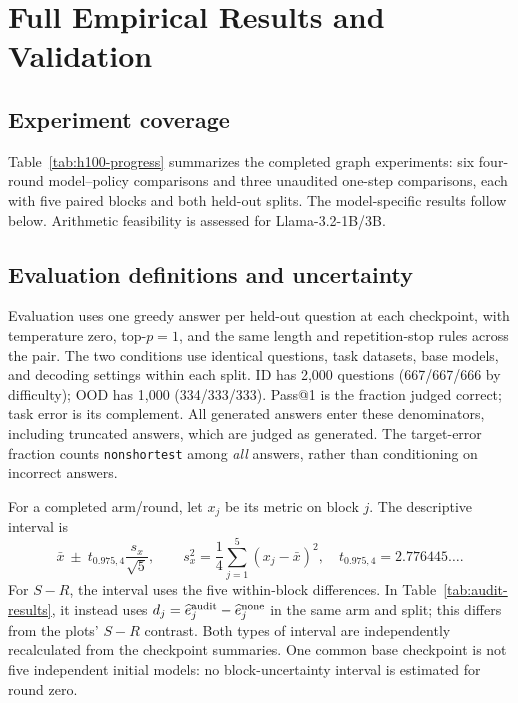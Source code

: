 \raggedbottom
\section{Full Empirical Results and Validation}
\label{app:h100-results}

\subsection{Experiment coverage}
Table~\ref{tab:h100-progress} summarizes the completed graph experiments:
six four-round model--policy comparisons and three unaudited one-step
comparisons, each with five paired blocks and both held-out splits.
The model-specific results follow below. Arithmetic feasibility is assessed
for Llama-3.2-1B/3B.



\subsection{Evaluation definitions and uncertainty}
Evaluation uses one greedy answer per held-out question at each checkpoint,
with temperature zero,
top-$p=1$, and the same length and repetition-stop rules across the pair.
The two conditions use identical questions, task datasets, base models,
and decoding settings within each split. ID has 2,000 questions
(667/667/666 by difficulty); OOD has 1,000 (334/333/333).
Pass@1 is the fraction judged correct; task error is its complement.
All generated answers enter these denominators, including truncated answers,
which are judged as generated. The target-error fraction counts \texttt{nonshortest} among \emph{all}
answers, rather than conditioning on incorrect answers.

For a completed arm/round, let $x_j$ be its metric on block $j$.
The descriptive interval is
\[
 \bar x\ \pm\ t_{0.975,4}\frac{s_x}{\sqrt5},\qquad
 s_x^2=\frac14\sum_{j=1}^5(x_j-\bar x)^2,
 \quad t_{0.975,4}=2.776445\ldots.
\]
For $S-R$, the interval uses the five within-block differences.
In Table~\ref{tab:audit-results}, it instead uses
$d_j=\widehat e^{\rm audit}_j-\widehat e^{\rm none}_j$ in the same arm
and split; this differs from the plots' $S-R$ contrast. Both types of
interval are independently recalculated from the checkpoint summaries.
One common base checkpoint is not five independent initial models: no
block-uncertainty interval is estimated for round zero.

